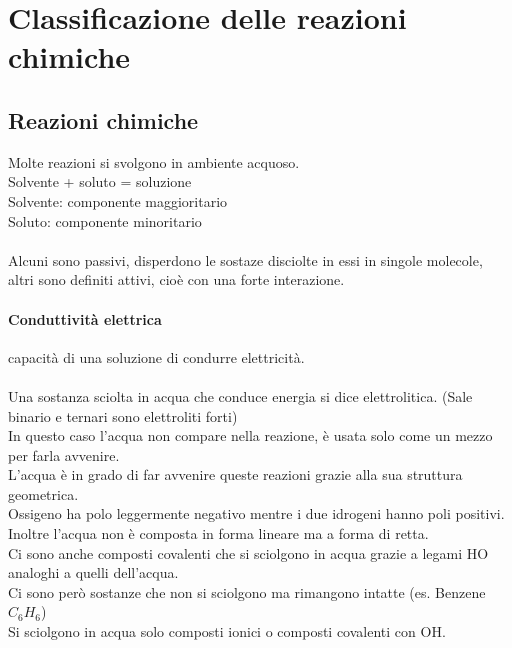 \section{Classificazione delle reazioni chimiche}
\subsection{Reazioni chimiche}
Molte reazioni si svolgono in ambiente acquoso.\\
Solvente + soluto = soluzione\\
Solvente: componente maggioritario\\
Soluto: componente minoritario\\\\
Alcuni sono passivi, disperdono le sostaze disciolte in essi in singole molecole, altri sono definiti attivi, cioè con una forte interazione.\\
\paragraph*{Conduttività elettrica}
capacità di una soluzione di condurre elettricità.\\\\
Una sostanza sciolta in acqua che conduce energia si dice elettrolitica. (Sale binario e ternari sono elettroliti forti)\\
In questo caso l'acqua non compare nella reazione, è usata solo come un mezzo per farla avvenire.\\
L'acqua è in grado di far avvenire queste reazioni grazie alla sua struttura geometrica.\\
Ossigeno ha polo leggermente negativo mentre i due idrogeni hanno poli positivi.\\
Inoltre l'acqua non è composta in forma lineare ma a forma di retta.\\
Ci sono anche composti covalenti che si sciolgono in acqua grazie a legami HO analoghi a quelli dell'acqua.\\
Ci sono però sostanze che non si sciolgono ma rimangono intatte (es. Benzene $C_6H_6$)\\
Si sciolgono in acqua solo composti ionici o composti covalenti con OH.

